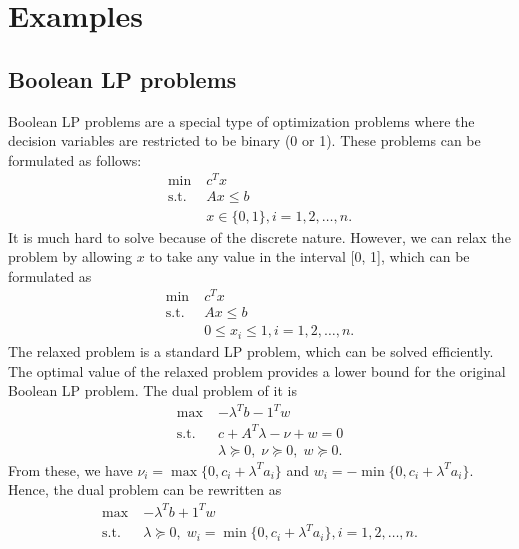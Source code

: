 \documentclass[lang=en,color=blue,mode=fancy,titlestyle=hang]{elegantbook}
\begin{document}
\section{Examples}
\subsection{Boolean LP problems}

Boolean LP problems are a special type of optimization problems where the decision variables are
restricted to be binary (0 or 1). These problems can be formulated as follows:
\begin{align*}
\min \; &c^T x\\
\text{s.t.} \; &Ax \leq b\\
&x \in \{0, 1\}, i = 1, 2, \ldots, n.
\end{align*}
It is much hard to solve because of the discrete nature. However, we can relax the problem by allowing
$x$ to take any value in the interval [0, 1], which can be formulated as
\begin{align*}
\min \; &c^T x\\
\text{s.t.} \; &Ax \leq b\\
&0 \leq x_i \leq 1, i = 1, 2, \ldots, n.
\end{align*}
The relaxed problem is a standard LP problem, which can be solved efficiently. The optimal value of
the relaxed problem provides a lower bound for the original Boolean LP problem. The dual problem of
it is
\begin{align*}
\max \; &-\lambda^T b - 1^T w\\
\text{s.t.} \; &c + A^T \lambda - \nu + w = 0\\
&\lambda \succeq 0, \; \nu \succeq 0, \; w \succeq 0.
\end{align*}
From these, we have $\nu_i = \max\{0, c_i + \lambda^T a_i\}$ and $w_i = -\min\{0, c_i + \lambda^T a_i\}$.
Hence, the dual problem can be rewritten as
\begin{align*}
\max \; &-\lambda^T b + 1^T w\\
\text{s.t.} \; &\lambda \succeq 0, \; w_i = \min\{0, c_i + \lambda^T a_i\}, i = 1, 2, \ldots, n.
\end{align*}
\end{document}
